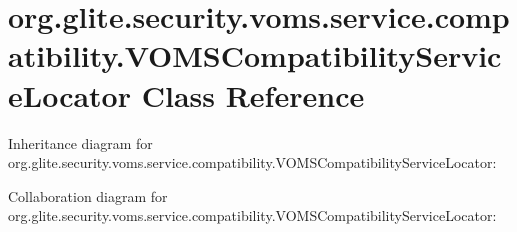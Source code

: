 \hypertarget{classorg_1_1glite_1_1security_1_1voms_1_1service_1_1compatibility_1_1VOMSCompatibilityServiceLocator}{
\section{org.glite.security.voms.service.compatibility.VOMSCompatibilityServiceLocator Class Reference}
\label{classorg_1_1glite_1_1security_1_1voms_1_1service_1_1compatibility_1_1VOMSCompatibilityServiceLocator}
}


Inheritance diagram for org.glite.security.voms.service.compatibility.VOMSCompatibilityServiceLocator:


Collaboration diagram for org.glite.security.voms.service.compatibility.VOMSCompatibilityServiceLocator:
